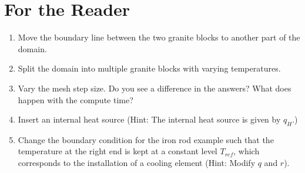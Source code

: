 \section{For the Reader}
\begin{enumerate}
 \item Move the boundary line between the two granite blocks to another part of
the domain.
 \item Split the domain into multiple granite blocks with varying temperatures.
 \item Vary the mesh step size. Do you see a difference in the answers? What
does happen with the compute time?
 \item Insert an internal heat source (Hint: The internal heat source is given
by $q_{H}$.)
 \item Change the boundary condition for the iron rod example such that the
temperature 
 at the right end is kept at a constant level $T_{ref}$, which
corresponds to the installation of a cooling element (Hint: Modify $q$ and
$r$). 
\end{enumerate}

